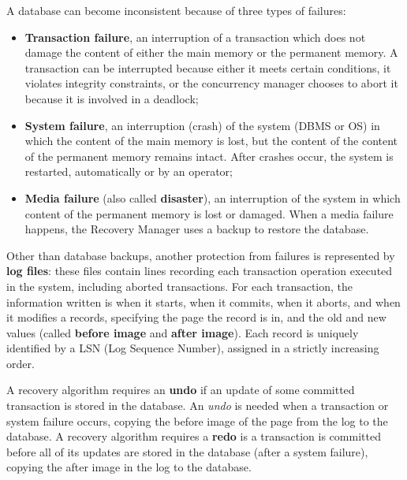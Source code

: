 A database can become inconsistent because of three types of failures:
\begin{itemize}
    \item \textbf{Transaction failure}, an interruption of a transaction which does not damage the content of either the main memory or the permanent memory. A transaction can be interrupted because either it meets certain conditions, it violates integrity constraints, or the concurrency manager chooses to abort it because it is involved in a deadlock;
    
    \item \textbf{System failure}, an interruption (crash) of the system (DBMS or OS) in which the content of the main memory is lost, but the content of the content of the permanent memory remains intact. After crashes occur, the system is restarted, automatically or by an operator;
    
    \item \textbf{Media failure} (also called \textbf{disaster}), an interruption of the system in which content of the permanent memory is lost or damaged. When a media failure happens, the Recovery Manager uses a backup to restore the database.
\end{itemize}
Other than database backups, another protection from failures is represented by \textbf{log files}: these files contain lines recording each transaction operation executed in the system, including aborted transactions. For each transaction, the information written is when it starts, when it commits, when it aborts, and when it modifies a records, specifying the page the record is in, and the old and new values (called \textbf{before image} and \textbf{after image}). Each record is uniquely identified by a LSN (Log Sequence Number), assigned in a strictly increasing order.

A recovery algorithm requires an \textbf{undo} if an update of some committed transaction is stored in the database. An \textit{undo} is needed when a transaction or system failure occurs, copying the before image of the page from the log to the database. A recovery algorithm requires a \textbf{redo} is a transaction is committed before all of its updates are stored in the database (after a system failure), copying the after image in the log to the database.

